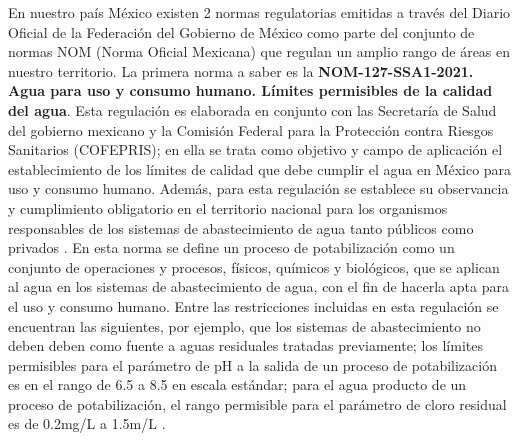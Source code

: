 En nuestro país México existen 2 normas regulatorias emitidas a través del Diario Oficial de la Federación del Gobierno de México como parte del conjunto de normas NOM (Norma Oficial Mexicana) que regulan un amplio rango 
de áreas en nuestro territorio. La primera norma a saber es la \textbf{NOM-127-SSA1-2021. Agua para uso y consumo humano. Límites permisibles de la calidad del agua}. Esta regulación es elaborada en conjunto con las Secretaría 
de Salud del gobierno mexicano y la Comisión Federal para la Protección contra Riesgos Sanitarios (COFEPRIS); en ella se trata como objetivo y campo de aplicación el establecimiento de los límites de calidad que debe cumplir 
el agua en México para uso y consumo humano. Además, para esta regulación se establece su observancia y cumplimiento obligatorio en el territorio nacional para los organismos responsables de los sistemas de abastecimiento 
de agua tanto públicos como privados \cite{nom-127-ssa1-2021}. En esta norma se define un proceso de potabilización como un conjunto de operaciones y procesos, físicos, químicos y biológicos, que se aplican al agua en los 
sistemas de abastecimiento de agua, con el fin de hacerla apta para el uso y consumo humano. Entre las restricciones incluidas en esta regulación se encuentran las siguientes, por ejemplo, que los sistemas de abastecimiento 
no deben deben como fuente a aguas residuales tratadas previamente; los límites permisibles para el parámetro de pH a la salida de un proceso de potabilización es en el rango de 6.5 a 8.5 en escala estándar; para el agua producto 
de un proceso de potabilización, el rango permisible para el parámetro de cloro residual es de 0.2mg/L a 1.5m/L \cite{nom-127-ssa1-2021}.  

